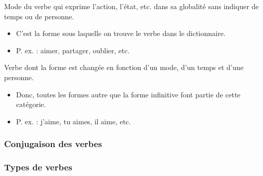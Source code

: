 \documentclass[10pt, french]{article}
\begin{document}
\begin{multicols*}{2}
\begin{definitionNOHFILLprop}
Mode du verbe qui exprime l'action, l'état, etc. dans sa globalité sans indiquer de temps ou de personne.
\begin{itemize}
	\item	C'est la forme sous laquelle on trouve le verbe dans le dictionnaire.
	\item	P. ex. : aimer, partager, oublier, etc.
\end{itemize}
\end{definitionNOHFILLprop}


\begin{definitionNOHFILLprop}
Verbe dont la forme est changée en fonction d'un mode, d'un temps et d'une personne.
\begin{itemize}
	\item	Donc, toutes les formes autre que la forme infinitive font partie de cette catégorie.
	\item	P. ex. : j'aime, tu aimes, il aime, etc.
\end{itemize}
\end{definitionNOHFILLprop}


\subsubsection{Conjugaison des verbes}


\subsubsection{Types de verbes}
\begin{definitionNOHFILLsub}

\end{definitionNOHFILLsub}
	
\begin{definitionNOHFILLsub}

\end{definitionNOHFILLsub}

\begin{definitionNOHFILLsub}

\end{definitionNOHFILLsub}

\begin{definitionNOHFILLsub}

\end{definitionNOHFILLsub}


\end{multicols*}
\end{document}
